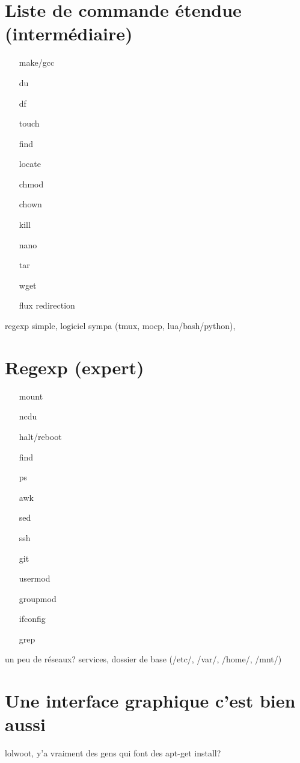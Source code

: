 \documentclass[french, a4paper, 12pt, titlepage]{article}
\begin{document}








\section{Liste de commande étendue (intermédiaire)}
\begin{enumerate}
\item[make/gcc]
\item[du]
\item[df]
\item[touch]
\item[find]
\item[locate]
\item[chmod]
\item[chown]
\item[kill]
\item[nano]
\item[tar]
\item[wget]
\item[flux redirection]
\end{enumerate}
regexp simple, logiciel sympa (tmux, mocp, lua/bash/python),

\section{Regexp (expert)}
\begin{enumerate}
\item[mount]
\item[ncdu]
\item[halt/reboot]
\item[find]
\item[ps]
\item[awk]
\item[sed]
\item[ssh]
\item[git]
\item[usermod]
\item[groupmod]
\item[ifconfig]
\item[grep]
\end{enumerate}
un peu de réseaux? services,
dossier de base (/etc/, /var/, /home/, /mnt/)

\section{Une interface graphique c'est bien aussi}
lolwoot, y'a vraiment des gens qui font des apt-get install? 
\end{document}
